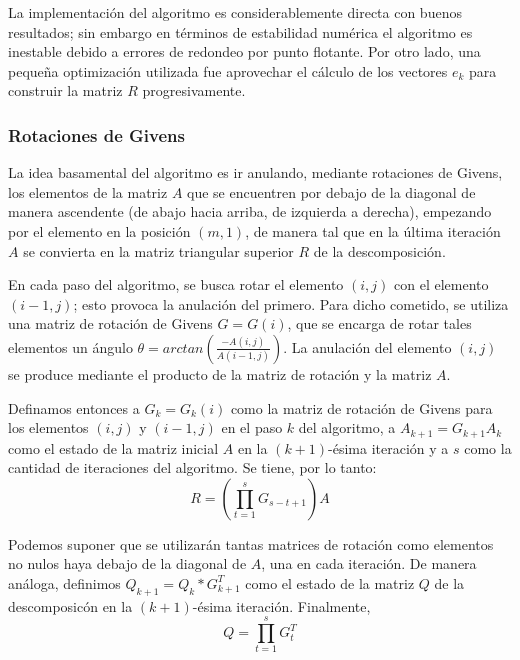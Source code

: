 \documentclass[journal, monochrome]{IEEEtran}
\begin{document}
La implementación del algoritmo es considerablemente directa con buenos resultados; sin embargo en términos de estabilidad numérica el algoritmo es inestable debido a errores de redondeo por punto flotante. 
Por otro lado, una pequeña optimización utilizada fue aprovechar el cálculo de los vectores $e_k$ para construir la matriz $R$ progresivamente.


\vspace{0.5cm}
\subsubsection{Rotaciones de Givens}
\par
La idea basamental del algoritmo es ir anulando, mediante rotaciones de Givens, los elementos de la matriz $A$ que se encuentren por debajo de la diagonal
de manera ascendente (de abajo hacia arriba, de izquierda a derecha), empezando por el elemento en la posición $(m,1)$, de manera
tal que en la última iteración $A$ se convierta en la matriz triangular superior $R$ de la descomposición.
\par
En cada paso del algoritmo, se busca rotar el elemento $(i,j)$ con el elemento $(i-1,j)$; esto provoca la anulación del primero.
Para dicho cometido, se utiliza una matriz de rotación de Givens $G = G(i)$, que se encarga de rotar tales elementos un
ángulo $\theta = arctan(\frac{-A(i,j)}{A(i-1,j)})$. La anulación del elemento $(i,j)$ se produce mediante el producto de la matriz de rotación y la matriz $A$.
\par
Definamos entonces a $G_k = G_k(i)$ como la matriz de rotación de Givens para los elementos $(i,j)$ y $(i-1,j)$ en el paso $k$ del algoritmo, a
$A_{k+1} = G_{k+1} A_k$ como el estado de la matriz inicial $A$ en la $(k+1)$-ésima iteración
y a $s$ como la cantidad de iteraciones del algoritmo. Se tiene, por lo tanto:
\begin{equation}
  R = (\displaystyle\prod_{t=1}^s G_{s-t+1}) A
\end{equation}

\par
Podemos suponer que se utilizarán tantas matrices de rotación como elementos no nulos haya debajo de la diagonal de $A$, una en cada iteración.
De manera análoga, definimos $Q_{k+1} = Q_k * G_{k+1}^T$ como el estado de la matriz $Q$ de la descomposicón en la $(k+1)$-ésima iteración. Finalmente,
\begin{equation}
Q = \displaystyle\prod_{t=1}^s G_{t}^T
\end{equation}
\end{document}
